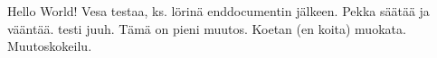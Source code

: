 \documentclass{article}
\begin{document}
Hello World!
Vesa testaa, ks. lörinä enddocumentin jälkeen.
Pekka säätää ja vääntää. testi
juuh.
Tämä on pieni muutos.
Koetan (en koita) muokata.
Muutoskokeilu.
\end{document}
